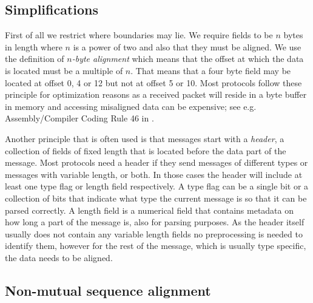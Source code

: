 \documentclass[a4paper]{report}
\begin{document}
\subsection{Simplifications}
\label{sec:simplifications}
First of all we restrict where boundaries may lie. We require fields to be $n$
bytes in length where $n$ is a power of two and also that they must be aligned.
We use the definition of \emph{$n$-byte alignment} which means that the offset
at which the data is located must be a multiple of $n$. That means that a four
byte field may be located at offset 0, 4 or 12 but not at offset 5 or 10. Most
protocols follow these principle for optimization reasons as a received packet
will reside in a byte buffer in memory and accessing misaligned data can be
expensive; see e.g. Assembly/Compiler Coding Rule 46 in .

Another principle that is often used is that messages start with a
\emph{header}, a collection of fields of fixed length that is located before
the data part of the message. Most protocols need a header if they send
messages of different types or messages with variable length, or both. In those
cases the header will include at least one type flag or length field
respectively. A type flag can be a single bit or a collection of bits that
indicate what type the current message is so that it can be parsed correctly. A
length field is a numerical field that contains metadata on how long a part of
the message is, also for parsing purposes. As the header itself usually does
not contain any variable length fields no preprocessing is needed to identify
them, however for the rest of the message, which is usually type specific, the
data needs to be aligned.

\subsection{Non-mutual sequence alignment}
\end{document}
